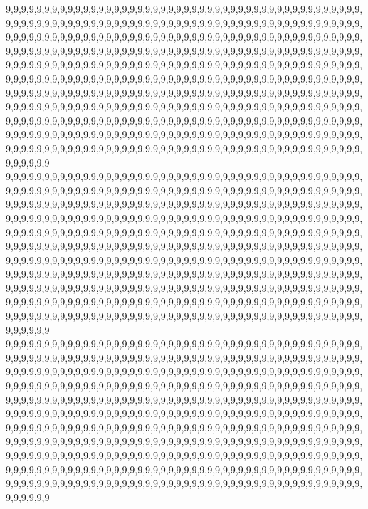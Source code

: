 9,9,9,9,9,9,9,9,9,9,9,9,9,9,9,9,9,9,9,9,9,9,9,9,9,9,9,9,9,9,9,9,9,9,9,9,9,9,9,9,9,9,9,9,9,9,9,9,9,9,9,9,9,9,9,9,9,9,9,9,9,9,9,9,9,9,9,9,9,9,9,9,9,9,9,9,9,9,9,9,9,9,9,9,9,9,9,9,9,9,9,9,9,9,9,9,9,9,9,9,9,9,9,9,9,9,9,9,9,9,9,9,9,9,9,9,9,9,9,9,9,9,9,9,9,9,9,9,9,9,9,9,9,9,9,9,9,9,9,9,9,9,9,9,9,9,9,9,9,9,9,9,9,9,9,9,9,9,9,9,9,9,9,9,9,9,9,9,9,9,9,9,9,9,9,9,9,9,9,9,9,9,9,9,9,9,9,9,9,9,9,9,9,9,9,9,9,9,9,9,9,9,9,9,9,9,9,9,9,9,9,9,9,9,9,9,9,9,9,9,9,9,9,9,9,9,9,9,9,9,9,9,9,9,9,9,9,9,9,9,9,9,9,9,9,9,9,9,9,9,9,9,9,9,9,9,9,9,9,9,9,9,9,9,9,9,9,9,9,9,9,9,9,9,9,9,9,9,9,9,9,9,9,9,9,9,9,9,9,9,9,9,9,9,9,9,9,9,9,9,9,9,9,9,9,9,9,9,9,9,9,9,9,9,9,9,9,9,9,9,9,9,9,9,9,9,9,9,9,9,9,9,9,9,9,9,9,9,9,9,9,9,9,9,9,9,9,9,9,9,9,9,9,9,9,9,9,9,9,9,9,9,9,9,9,9,9,9,9,9,9,9,9,9,9,9,9,9,9,9,9,9,9,9,9,9,9,9,9,9,9,9,9,9,9,9,9,9,9,9,9,9,9,9,9,9,9,9,9,9,9,9,9,9,9,9,9,9,9,9,9,9,9,9,9,9,9,9,9,9,9,9,9,9,9,9,9,9,9,9,9,9,9,9,9,9,9,9,9,9,9,9,9,9,9,9,9,9,9,9,9,9,9,9,9,9,9,9,9,9,9,9,9,9,9,9,9,9,9,9,9,9,9,9,9,9,9,9,9,9,9,9,9,9,9,9,9,9,9,9,9,9,9,9,9,9,9,9,9,9,9,9
9,9,9,9,9,9,9,9,9,9,9,9,9,9,9,9,9,9,9,9,9,9,9,9,9,9,9,9,9,9,9,9,9,9,9,9,9,9,9,9,9,9,9,9,9,9,9,9,9,9,9,9,9,9,9,9,9,9,9,9,9,9,9,9,9,9,9,9,9,9,9,9,9,9,9,9,9,9,9,9,9,9,9,9,9,9,9,9,9,9,9,9,9,9,9,9,9,9,9,9,9,9,9,9,9,9,9,9,9,9,9,9,9,9,9,9,9,9,9,9,9,9,9,9,9,9,9,9,9,9,9,9,9,9,9,9,9,9,9,9,9,9,9,9,9,9,9,9,9,9,9,9,9,9,9,9,9,9,9,9,9,9,9,9,9,9,9,9,9,9,9,9,9,9,9,9,9,9,9,9,9,9,9,9,9,9,9,9,9,9,9,9,9,9,9,9,9,9,9,9,9,9,9,9,9,9,9,9,9,9,9,9,9,9,9,9,9,9,9,9,9,9,9,9,9,9,9,9,9,9,9,9,9,9,9,9,9,9,9,9,9,9,9,9,9,9,9,9,9,9,9,9,9,9,9,9,9,9,9,9,9,9,9,9,9,9,9,9,9,9,9,9,9,9,9,9,9,9,9,9,9,9,9,9,9,9,9,9,9,9,9,9,9,9,9,9,9,9,9,9,9,9,9,9,9,9,9,9,9,9,9,9,9,9,9,9,9,9,9,9,9,9,9,9,9,9,9,9,9,9,9,9,9,9,9,9,9,9,9,9,9,9,9,9,9,9,9,9,9,9,9,9,9,9,9,9,9,9,9,9,9,9,9,9,9,9,9,9,9,9,9,9,9,9,9,9,9,9,9,9,9,9,9,9,9,9,9,9,9,9,9,9,9,9,9,9,9,9,9,9,9,9,9,9,9,9,9,9,9,9,9,9,9,9,9,9,9,9,9,9,9,9,9,9,9,9,9,9,9,9,9,9,9,9,9,9,9,9,9,9,9,9,9,9,9,9,9,9,9,9,9,9,9,9,9,9,9,9,9,9,9,9,9,9,9,9,9,9,9,9,9,9,9,9,9,9,9,9,9,9,9,9,9,9,9,9,9,9,9,9,9,9,9,9,9,9,9,9,9,9,9,9,9,9,9,9,9,9,9,9,9,9
9,9,9,9,9,9,9,9,9,9,9,9,9,9,9,9,9,9,9,9,9,9,9,9,9,9,9,9,9,9,9,9,9,9,9,9,9,9,9,9,9,9,9,9,9,9,9,9,9,9,9,9,9,9,9,9,9,9,9,9,9,9,9,9,9,9,9,9,9,9,9,9,9,9,9,9,9,9,9,9,9,9,9,9,9,9,9,9,9,9,9,9,9,9,9,9,9,9,9,9,9,9,9,9,9,9,9,9,9,9,9,9,9,9,9,9,9,9,9,9,9,9,9,9,9,9,9,9,9,9,9,9,9,9,9,9,9,9,9,9,9,9,9,9,9,9,9,9,9,9,9,9,9,9,9,9,9,9,9,9,9,9,9,9,9,9,9,9,9,9,9,9,9,9,9,9,9,9,9,9,9,9,9,9,9,9,9,9,9,9,9,9,9,9,9,9,9,9,9,9,9,9,9,9,9,9,9,9,9,9,9,9,9,9,9,9,9,9,9,9,9,9,9,9,9,9,9,9,9,9,9,9,9,9,9,9,9,9,9,9,9,9,9,9,9,9,9,9,9,9,9,9,9,9,9,9,9,9,9,9,9,9,9,9,9,9,9,9,9,9,9,9,9,9,9,9,9,9,9,9,9,9,9,9,9,9,9,9,9,9,9,9,9,9,9,9,9,9,9,9,9,9,9,9,9,9,9,9,9,9,9,9,9,9,9,9,9,9,9,9,9,9,9,9,9,9,9,9,9,9,9,9,9,9,9,9,9,9,9,9,9,9,9,9,9,9,9,9,9,9,9,9,9,9,9,9,9,9,9,9,9,9,9,9,9,9,9,9,9,9,9,9,9,9,9,9,9,9,9,9,9,9,9,9,9,9,9,9,9,9,9,9,9,9,9,9,9,9,9,9,9,9,9,9,9,9,9,9,9,9,9,9,9,9,9,9,9,9,9,9,9,9,9,9,9,9,9,9,9,9,9,9,9,9,9,9,9,9,9,9,9,9,9,9,9,9,9,9,9,9,9,9,9,9,9,9,9,9,9,9,9,9,9,9,9,9,9,9,9,9,9,9,9,9,9,9,9,9,9,9,9,9,9,9,9,9,9,9,9,9,9,9,9,9,9,9,9,9,9,9,9,9,9,9,9,9,9,9,9,9,9,9
